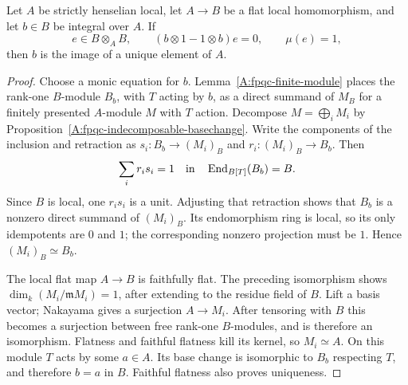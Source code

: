 \begin{theorem}
\label{A:fpqc-local-integral}
Let $A$ be strictly henselian local, let $A\to B$ be a flat local
homomorphism, and let $b\in B$ be integral over $A$.  If
\[
 e\in B\otimes_A B,\qquad
 (b\otimes1-1\otimes b)e=0,\qquad \mu(e)=1,
\]
then $b$ is the image of a unique element of $A$.
\end{theorem}
\begin{proof}
Choose a monic equation for $b$.  Lemma~\ref{A:fpqc-finite-module}
places the rank-one $B$-module $B_b$, with $T$ acting by $b$, as a
direct summand of $M_B$ for a finitely presented $A$-module $M$
with $T$ action.  Decompose $M=\bigoplus_i M_i$ by
Proposition~\ref{A:fpqc-indecomposable-basechange}.
Write the components of the inclusion and retraction as
$s_i:B_b\to(M_i)_B$ and $r_i:(M_i)_B\to B_b$.  Then
\[
                 \sum_i r_i s_i=1\quad\hbox{in}\quad
                 \operatorname{End}_{B[T]}(B_b)=B.
\]
Since $B$ is local, one $r_i s_i$ is a unit.  Adjusting that
retraction shows that $B_b$ is a nonzero direct summand of
$(M_i)_B$.  Its endomorphism ring is local, so its only idempotents
are $0$ and $1$; the corresponding nonzero projection must be $1$.
Hence $(M_i)_B\simeq B_b$.

The local flat map $A\to B$ is faithfully flat.  The preceding
isomorphism shows
$\dim_k(M_i/\mathfrak mM_i)=1$, after extending to the residue
field of $B$.  Lift a basis vector; Nakayama gives a surjection
$A\to M_i$.  After tensoring with $B$ this becomes a surjection
between free rank-one $B$-modules, and is therefore an isomorphism.
Flatness and faithful flatness kill its kernel, so $M_i\simeq A$.
On this module $T$ acts by some $a\in A$.  Its base change is
isomorphic to $B_b$ respecting $T$, and therefore $b=a$ in $B$.
Faithful flatness also proves uniqueness.
\end{proof}

